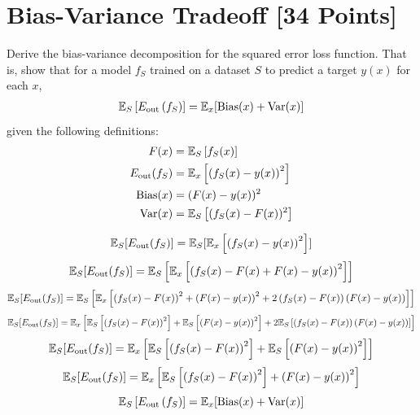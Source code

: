 
\newpage
\section{Bias-Variance Tradeoff [34 Points]}

\begin{problem}[5]
  Derive the bias-variance decomposition for the squared error loss function. That is, show that for a model $f_S$ trained on a dataset $S$ to predict a target $y(x)$ for each $x$,
  \begin{align*}
    \mathbb{E}_S \left[E_\text{out}\left(f_S\right)\right] = \mathbb{E}_x[\operatorname{Bias}(x) + \operatorname{Var}(x)]
  \end{align*}
  given the following definitions:
  \begin{align*}
    F(x) &= \mathbb{E}_S\left[f_S(x) \right] \\
    E_\text{out}(f_S) &= \mathbb{E}_x\left[\left(f_S(x) - y(x)\right)^2\right] \\
    \operatorname{Bias}(x) &= (F(x) - y(x))^2 \\
    \operatorname{Var}(x) &= \mathbb{E}_S\left[(f_S(x)-F(x))^2\right]
  \end{align*}
\end{problem}

\begin{solution}
  \begin{equation}
    \mathbb{E}_S[E_\text{out}(f_S)] = \mathbb{E}_S[\mathbb{E}_x\left[\left(f_S(x) - y(x)\right)^2\right]]
    \end{equation}
    \begin{equation}
      \mathbb{E}_S[E_\text{out}(f_S)] = \mathbb{E}_S\left[\mathbb{E}_x\left[\left(f_S(x)-F(x) +F(x) - y(x)\right)^2\right]\right]
    \end{equation}
    \begin{equation}
      \mathbb{E}_S[E_\text{out}(f_S)] = \mathbb{E}_S\left[\mathbb{E}_x\left[\left(f_S(x)-F(x)\right)^2 +\left(F(x) - y(x)\right)^2+2\left(f_S(x)-F(x)\right)\left(F(x)-y(x)\right)\right]\right]
    \end{equation}
    \begin{equation}
      \mathbb{E}_S[E_\text{out}(f_S)] = \mathbb{E}_x\left[\mathbb{E}_S\left[\left(f_S(x)-F(x)\right)^2\right] +\mathbb{E}_S\left[\left(F(x)-y(x)\right)^2\right]+2\mathbb{E}_S\left[\left(f_S(x)-F(x)\right)\left(F(x) - y(x)\right)\right]\right]
    \end{equation}
    \begin{equation}
      \mathbb{E}_S[E_\text{out}(f_S)] = \mathbb{E}_x\left[\mathbb{E}_S\left[\left(f_S(x)-F(x)\right)^2\right] +\mathbb{E}_S\left[\left(F(x) - y(x)\right)^2\right]\right]
    \end{equation}
    \begin{equation}
      \mathbb{E}_S[E_\text{out}(f_S)] = \mathbb{E}_x\left[\mathbb{E}_S\left[\left(f_S(x)-F(x)\right)^2\right] +\left(F(x)-y(x)\right)^2\right]
    \end{equation}
    \begin{equation}
      \mathbb{E}_S \left[E_\text{out}\left(f_S\right)\right] = \mathbb{E}_x[\operatorname{Bias}(x) + \operatorname{Var}(x)]
    \end{equation}
\end{solution}

